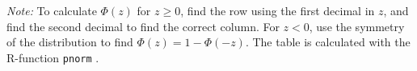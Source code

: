 \documentclass[10pt]{article}
\begin{document}
\begin{table}
    \medskip
    \emph{Note:} To calculate $\Phi(z)$ for $z\geq0$, find the row using the
    first decimal in $z$, and find the second decimal to find the correct
    column. For $z<0$, use the symmetry of the distribution to find  $\Phi(z) =
    1-\Phi(-z)$. The table is calculated with the R-function \texttt{pnorm} \citep{R2023}.
\end{table}
\end{document}
